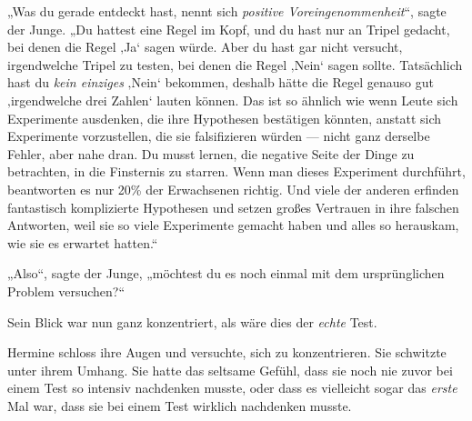 „Was du gerade entdeckt hast, nennt sich \emph{positive Voreingenommenheit}“, sagte der Junge.
„Du hattest eine Regel im Kopf, und du hast nur an Tripel gedacht, bei denen die Regel ‚Ja‘ sagen würde. Aber du hast gar nicht versucht, irgendwelche Tripel zu testen, bei denen die Regel ‚Nein‘ sagen sollte. Tatsächlich hast du \emph{kein einziges} ‚Nein‘ bekommen, deshalb hätte die Regel genauso gut ‚irgendwelche drei Zahlen‘ lauten können. Das ist so ähnlich wie wenn Leute sich Experimente ausdenken, die ihre Hypothesen bestätigen könnten, anstatt sich Experimente vorzustellen, die sie falsifizieren würden — nicht ganz derselbe Fehler, aber nahe dran. Du musst lernen, die negative Seite der Dinge zu betrachten, in die Finsternis zu starren. Wenn man dieses Experiment durchführt, beantworten es nur 20\% der Erwachsenen richtig. Und viele der anderen erfinden fantastisch komplizierte Hypothesen und setzen großes Vertrauen in ihre falschen Antworten, weil sie so viele Experimente gemacht haben und alles so herauskam, wie sie es erwartet hatten.“

„Also“, sagte der Junge, „möchtest du es noch einmal mit dem ursprünglichen Problem versuchen?“

Sein Blick war nun ganz konzentriert, als wäre dies der \emph{echte} Test.

Hermine schloss ihre Augen und versuchte, sich zu konzentrieren. Sie schwitzte unter ihrem Umhang. Sie hatte das seltsame Gefühl, dass sie noch nie zuvor bei einem Test so intensiv nachdenken musste, oder dass es vielleicht sogar das \emph{erste} Mal war, dass sie bei einem Test wirklich nachdenken musste.

